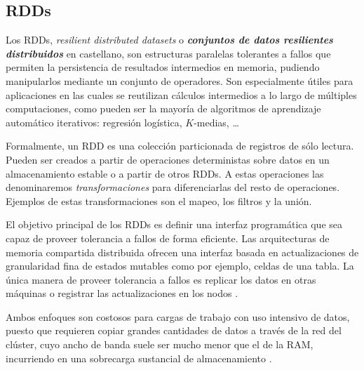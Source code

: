 \subsection{RDDs}

Los RDDs, \textit{resilient distributed datasets} o \textbf{\textit{conjuntos de datos resilientes distribuidos}} en
castellano, son estructuras paralelas tolerantes a fallos que permiten la persistencia de resultados intermedios en
memoria, pudiendo manipularlos mediante un conjunto de operadores. Son especialmente útiles para aplicaciones en las
cuales se reutilizan cálculos intermedios a lo largo de múltiples computaciones, como pueden ser la mayoría de 
algoritmos de aprendizaje automático iterativos: regresión logística, $K$-medias, \dots \cite{rdds}

\vspace{10pt}
Formalmente, un RDD es una colección particionada de registros de sólo lectura. Pueden ser creados a partir de 
operaciones deterministas sobre datos en un almacenamiento estable o a partir de otros RDDs. A estas operaciones las
denominaremos \textit{transformaciones} para diferenciarlas del resto de operaciones. Ejemplos de estas 
transformaciones son el mapeo, los filtros y la unión.

\vspace{10pt}
El objetivo principal de los RDDs es definir una interfaz programática que sea capaz de proveer tolerancia a fallos de
forma eficiente. Las arquitecturas de memoria compartida distribuida ofrecen una interfaz basada en actualizaciones
de granularidad fina de estados mutables como por ejemplo, celdas de una tabla. La única manera de proveer tolerancia
a fallos es replicar los datos en otras máquinas o registrar las actualizaciones en los nodos \cite{rdds}. 

\vspace{10pt}
Ambos enfoques son costosos para cargas de trabajo con uso intensivo de datos, puesto que requieren copiar grandes 
cantidades de datos a través de la red del clúster, cuyo ancho de banda suele ser mucho menor que el de la RAM, 
incurriendo en una sobrecarga sustancial de almacenamiento \cite{rdds}.

